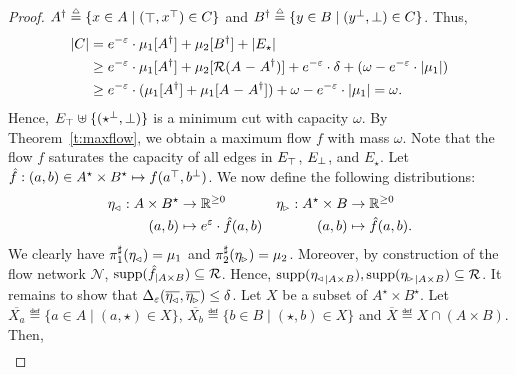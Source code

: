 \documentclass{lmcs}
\begin{document}
\begin{proof}
  $A^\dagger \mathrel{\stackrel{\scriptscriptstyle \triangle}{=}} \{ x \in A \mid (\mathop{\top}, x^{\mathop{\top}}) \in C \}$
  and
  $B^\dagger \mathrel{\stackrel{\scriptscriptstyle \triangle}{=}} \{ y \in B \mid (y^{\mathop{\perp}}, \mathop{\perp}) \in C \}$.
  Thus,
  \begin{align*}
   |{C}|
    &= e^{-\varepsilon}\cdot\mu_1[A^\dagger] + \mu_2[B^\dagger] + |{E_{\star}}| \\
    &\geq e^{-\varepsilon}\cdot\mu_1[A^\dagger]
        + \mu_2[\mathcal{R}(A \mathrel{-} A^{\dagger})]
        + e^{-\varepsilon}\cdot \delta
        + (\omega - e^{-\varepsilon}\cdot|{\mu_1}|) \\
    &\geq e^{-\varepsilon}\cdot(\mu_1[A^\dagger]
        + \mu_1[A \mathrel{-} A^{\dagger}])
        + \omega - e^{-\varepsilon}\cdot|{\mu_1}|
     = \omega.
  \end{align*}
  Hence, $E_{\mathop{\top}} \uplus \{(\star^{\mathop{\perp}}, \mathop{\perp})\}$ is a minimum
  cut with capacity $\omega$.
  By Theorem~\ref{t:maxflow},
  we obtain a maximum flow $f$ with mass $\omega$.
  Note that the flow $f$ saturates the capacity of
  all edges in $E_{\mathop{\top}}$, $E_{\mathop{\perp}}$, and $E_{\star}$.
  Let $\hat{f} : (a, b) \in A^\star \times B^\star \mapsto f(a^{\mathop{\top}}, b^{\mathop{\perp}})$.
  We now define the following distributions:
  \[ \begin{array}{ll}
  \begin{aligned}
    \eta_{\mspace{-1.5mu}{\scriptscriptstyle \vartriangleleft}} : A \times B^\star &\to \mathbb{R}^{\geq 0} \\
      (a, b) &\mapsto e^{\varepsilon} \cdot \hat{f}(a, b)
  \end{aligned} &
  \begin{aligned}
    \eta_{\mspace{-1.5mu}{\scriptscriptstyle \vartriangleright}} : A^\star \times B &\to \mathbb{R}^{\geq 0} \\
      (a, b) &\mapsto \hat{f}(a, b).
  \end{aligned}
  \end{array}\]
  We clearly have $\pi_{1}^{\sharp}(\eta_{\mspace{-1.5mu}{\scriptscriptstyle \vartriangleleft}}) = \mu_1$ and
  $\pi_{2}^{\sharp}(\eta_{\mspace{-1.5mu}{\scriptscriptstyle \vartriangleright}}) = \mu_2$.
  Moreover, by construction of the
  flow network $\mathcal{N}$, $\operatorname{supp}(\hat{f}_{|A \times B}) \subseteq \mathcal{R}$. Hence,
  $\operatorname{supp}({\eta_{\mspace{-1.5mu}{\scriptscriptstyle \vartriangleleft}}}_{|A \times B}) ,
   \operatorname{supp}({\eta_{\mspace{-1.5mu}{\scriptscriptstyle \vartriangleright}}}_{|A \times B}) \subseteq \mathcal{R}$.
  It remains to show that
  $\Delta_{\varepsilon}(\overline{\eta_{\mspace{-1.5mu}{\scriptscriptstyle \vartriangleleft}}}, \overline{\eta_{\mspace{-1.5mu}{\scriptscriptstyle \vartriangleright}}}) \leq \delta$.
  Let $X$ be a subset of $A^\star \times B^\star$.
  Let
  $\overline{X_a} \eqdef \{ a \in A \mid (a, \star) \in X \}$,
  $\overline{X_b} \eqdef \{ b \in B \mid (\star, b) \in X \}$ and
  $\overline{X} \eqdef X \cap (A \times B)$.
  Then,
  \begingroup
  \allowdisplaybreaks
  \begin{align*}

\end{align*}
\end{proof}
\end{document}
